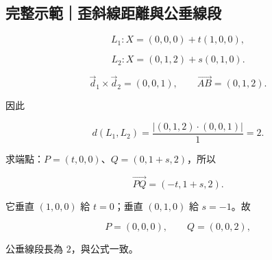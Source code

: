 \documentclass[11pt,a4paper]{article}
\begin{document}
\begin{HandoutWorkedExample}

\subsection{完整示範｜歪斜線距離與公垂線段}\label{ux5b8cux6574ux793aux7bc4ux6b6aux659cux7ddaux8dddux96e2ux8207ux516cux5782ux7ddaux6bb5}

\[
L_1:X=(0,0,0)+t(1,0,0),
\]

\[
L_2:X=(0,1,2)+s(0,1,0).
\]

\[
\vec d_1\times\vec d_2=(0,0,1),
\qquad
\overrightarrow{AB}=(0,1,2).
\]

因此

\[
d(L_1,L_2)
=\frac{|(0,1,2)\cdot(0,0,1)|}{1}
=\boxed2.
\]

求端點：\(P=(t,0,0)\)、\(Q=(0,1+s,2)\)，所以

\[
\overrightarrow{PQ}=(-t,1+s,2).
\]

它垂直 \((1,0,0)\) 給 \(t=0\)；垂直 \((0,1,0)\) 給 \(s=-1\)。故

\[
P=(0,0,0),\qquad Q=(0,0,2),
\]

公垂線段長為 \(2\)，與公式一致。

\end{HandoutWorkedExample}
\end{document}
